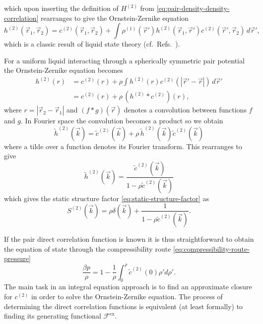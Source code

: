 which upon inserting the definition of $H^{(2)}$ from \eqref{eq:pair-density-density-correlation} rearranges to give the Ornstein-Zernike equation
\begin{equation}\label{eq:ornstein-zernike-generic}
  h^{(2)}(\vec{r}_1, \vec{r}_2) =
  c^{(2)}(\vec{r}_1, \vec{r}_2) +
  \int
  \rho^{(1)}(\vec{r}')
  h^{(2)}(\vec{r}_1, \vec{r}')
  c^{(2)}(\vec{r}', \vec{r}_2)
  \, d\vec{r}',
\end{equation}
which is a classic result of liquid state theory (cf.\ Refs.\ \cite{OrnsteinPAS1914,Hansen2013,EvansAP1979}).

\vspace{0.5em}

\begin{tcolorbox}[title=Ornstein-Zernike equation for a uniform simple liquid]
For a uniform liquid interacting through a spherically symmetric pair potential the Ornstein-Zernike equation becomes
\begin{equation}\label{eq:ornstein-zernike-spherical}
  \begin{split}
    h^{(2)}(r)
    &=
    c^{(2)}(r) +
    \rho
    \int
    h^{(2)}(r)
    c^{(2)}(|\vec{r}' - \vec{r}|)
    \, d\vec{r}'
    \\ &=
    c^{(2)}(r) + \rho \, (h^{(2)} * c^{(2)})(r),
  \end{split}
\end{equation}
where $r = |\vec{r}_2 - \vec{r}_1|$ and $(f*g)(\vec{r})$ denotes a convolution between functions $f$ and $g$.
In Fourier space the convolution becomes a product so we obtain
\begin{equation*}
  \tilde{h}^{(2)}(\vec{k})
  =
  \tilde{c}^{(2)}(\vec{k}) +
  \rho \, \tilde{h}^{(2)}(\vec{k}) \tilde{c}^{(2)}(\vec{k})
\end{equation*}
where a tilde over a function denotes its Fourier transform.
This rearranges to give
\begin{equation*}
  \tilde{h}^{(2)}(\vec{k})
  =
  \frac{\tilde{c}^{(2)}(\vec{k})}{1 - \rho \tilde{c}^{(2)}(\vec{k})}
\end{equation*}
which gives the static structure factor \eqref{eq:static-structure-factor} as
\begin{equation*}
  S^{(2)}(\vec{k})
  =
  \rho \delta(\vec{k}) +
  \frac{1}{1 - \rho \tilde{c}^{(2)}(\vec{k})}.
\end{equation*}
\end{tcolorbox}

If the pair direct correlation function is known it is thus straightforward to obtain the equation of state through the compressibility route \eqref{eq:compressibility-route-pressure}
\begin{equation*}
  \frac{\beta p}{\rho}
  =
  1 - \frac{1}{\rho} \int_0^\rho \tilde{c}^{(2)}(0) \rho' d\rho'.
\end{equation*}
The main task in an integral equation approach is to find an approximate closure for $c^{(2)}$ in order to solve the Ornstein-Zernike equation.
The process of determining the direct correlation functions is equivalent (at least formally) to finding its generating functional $\mathcal{F}^\mathrm{ex}$.


